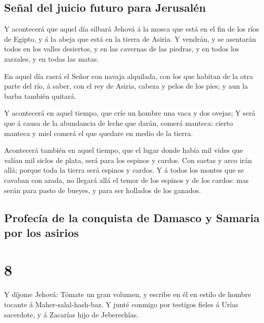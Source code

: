 \hypertarget{seuxf1al-del-juicio-futuro-para-jerusaluxe9n}{%
\subsection{Señal del juicio futuro para
Jerusalén}\label{seuxf1al-del-juicio-futuro-para-jerusaluxe9n}}

 Y acontecerá que aquel día silbará Jehová á la mosca que
está en el fin de los ríos de Egipto, y á la abeja que está en la tierra
de Asiria.  Y vendrán, y se asentarán todos en los valles
desiertos, y en las cavernas de las piedras, y en todos los zarzales, y
en todas las matas.

 En aquel día raerá el Señor con navaja alquilada, con
los que habitan de la otra parte del río, á saber, con el rey de Asiria,
cabeza y pelos de los pies; y aun la barba también quitará.

 Y acontecerá en aquel tiempo, que críe un hombre una
vaca y dos ovejas;  Y será que á causa de la abundancia
de leche que darán, comerá manteca: cierto manteca y miel comerá el que
quedare en medio de la tierra.

 Acontecerá también en aquel tiempo, que el lugar donde
había mil vides que valían mil siclos de plata, será para los espinos y
cardos.  Con saetas y arco irán allá; porque toda la
tierra será espinos y cardos.  Y á todos los montes que
se cavaban con azada, no llegará allá el temor de los espinos y de los
cardos: mas serán para pasto de bueyes, y para ser hollados de los
ganados.

\hypertarget{profecuxeda-de-la-conquista-de-damasco-y-samaria-por-los-asirios}{%
\subsection{Profecía de la conquista de Damasco y Samaria por los
asirios}\label{profecuxeda-de-la-conquista-de-damasco-y-samaria-por-los-asirios}}

\hypertarget{section-7}{%
\section{8}\label{section-7}}

 Y díjome Jehová: Tómate un gran volumen, y escribe en él
en estilo de hombre tocante á Maher-salal-hash-baz.  Y
junté conmigo por testigos fieles á Urías sacerdote, y á Zacarías hijo
de Jeberechîas.

